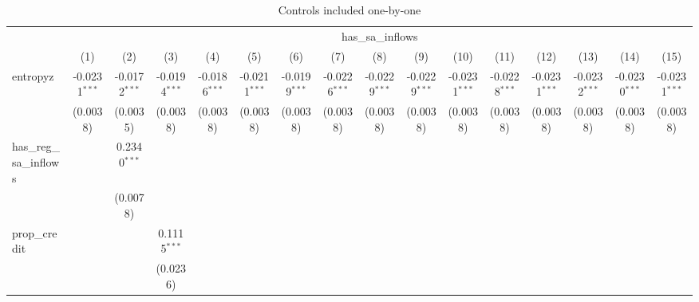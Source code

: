 
\begin{table}[htbp]
   \centering
   \caption{\label{tab:reg_sw0} Controls included one-by-one}
   \begin{tiny}
      \begin{tabular}{lccccccccccccccc}
         \toprule
          & \multicolumn{15}{c}{has\_sa\_inflows}\\
                                  & (1)             & (2)             & (3)             & (4)             & (5)             & (6)             & (7)             & (8)             & (9)             & (10)            & (11)            & (12)            & (13)            & (14)            & (15)\\
         \midrule 
         entropyz                 & -0.0231$^{***}$ & -0.0172$^{***}$ & -0.0194$^{***}$ & -0.0186$^{***}$ & -0.0211$^{***}$ & -0.0199$^{***}$ & -0.0226$^{***}$ & -0.0229$^{***}$ & -0.0229$^{***}$ & -0.0231$^{***}$ & -0.0228$^{***}$ & -0.0231$^{***}$ & -0.0232$^{***}$ & -0.0230$^{***}$ & -0.0231$^{***}$\\
                                  & (0.0038)        & (0.0035)        & (0.0038)        & (0.0038)        & (0.0038)        & (0.0038)        & (0.0038)        & (0.0038)        & (0.0038)        & (0.0038)        & (0.0038)        & (0.0038)        & (0.0038)        & (0.0038)        & (0.0038)\\
         has\_reg\_sa\_inflows &                 & 0.2340$^{***}$  &                 &                 &                 &                 &                 &                 &                 &                 &                 &                 &                 &                 &   \\
                                  &                 & (0.0078)        &                 &                 &                 &                 &                 &                 &                 &                 &                 &                 &                 &                 &   \\
         prop\_credit            &                 &                 & 0.1115$^{***}$  &                 &                 &                 &                 &                 &                 &                 &                 &                 &                 &                 &   \\
                                  &                 &                 & (0.0236)        &                 &                 &                 &                 &                 &                 &                 &                 &                 &                 &                 &   \\

\end{tabular}
\end{tiny}
\end{table}

